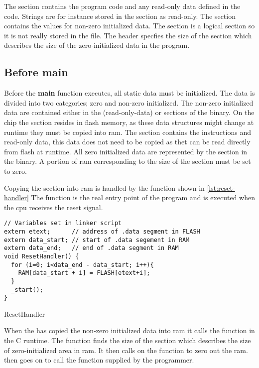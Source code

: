 The  section contains the program code and any read-only data defined in the code.
Strings are for instance stored in the  section as read-only.
The  section contains the values for non-zero initialized data.
The  section is a logical section so it is not really stored in the file.
The header specfies the size of the  section which describes the size of the zero-initialized data in the program.

\subsection{Before main}

Before the \textbf{main} function executes, all static data must be initialized.
The data is divided into two categories; zero and non-zero initialized.
The non-zero initialized data are contained either in the  (read-only-data) or  sections of the \elf binary.
On the chip the  section resides in flash memory, as these data structures might change at runtime they must be copied into \gls{ram}.
The  section contains the instructions and read-only data, this data does not need to be copied as thet can be read directly from flash at runtime.
All zero initialized data are represented by the  section in the \elf binary.
A portion of \gls{ram} corresponding to the size of the  section must be set to zero.

Copying the  section into \gls{ram} is handled by the  function shown in \autoref{lst:reset-handler}
The function is the real entry point of the program and is executed when the \gls{cpu} receives the reset signal.

\begin{listing}[H]
\begin{verbatim}
// Variables set in linker script
extern etext;      // address of .data segment in FLASH
extern data_start; // start of .data segement in RAM
extern data_end;   // end of .data segment in RAM
void ResetHandler() {
  for (i=0; i<data_end - data_start; i++){
    RAM[data_start + i] = FLASH[etext+i];
  }
  _start();
}
\end{verbatim}
\caption{ResetHandler}
\label{lst:reset-handler}
\end{listing}

When the  has copied the non-zero initialized data into \gls{ram} it calls the  function in the C runtime.
The  function finds the size of the  section which describes the size of zero-initialized area in \gls{ram}.
It then calls on the  function to zero out the \gls{ram}.
 then goes on to call the \main function supplied by the programmer.

